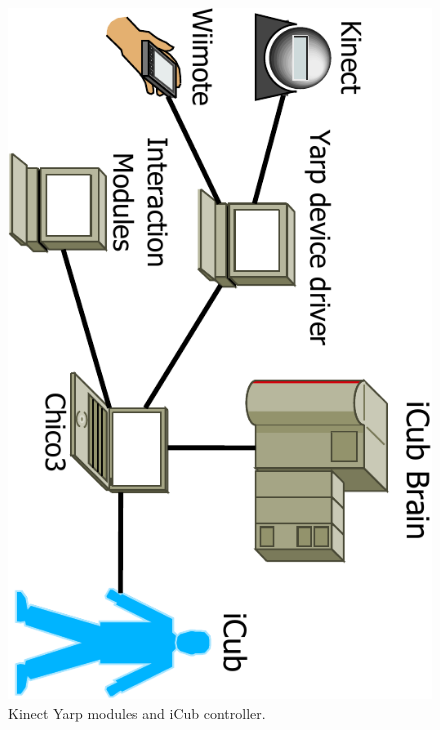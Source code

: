 	\begin{figure}[htb]
	\begin{center}
	\includegraphics[scale=0.50,page=3,angle=90]{icubSimpleNetworkDiagram-crop.pdf}
	\end{center}
	\caption[Kinect modules diagram]{Kinect Yarp modules and iCub controller.} 
	\label{fig:KinectNetworkDiagram}
	\end{figure}
	
